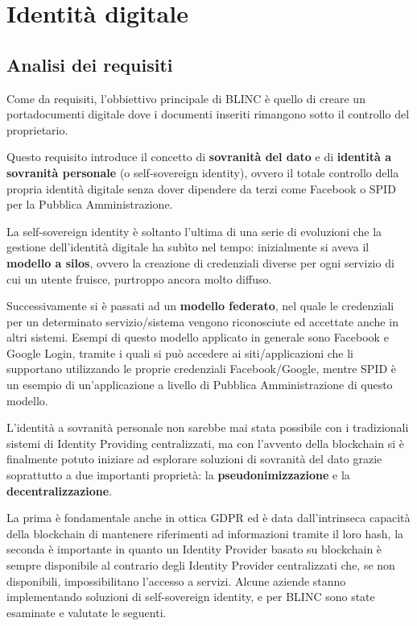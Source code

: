 \chapter{Identità digitale}

\section{Analisi dei requisiti}
Come da requisiti, l’obbiettivo principale di BLINC è quello di creare un portadocumenti digitale
dove i documenti inseriti rimangono sotto il controllo del proprietario.

Questo requisito introduce il concetto di \textbf{sovranità del dato} e di \textbf{identità a sovranità personale} (o self-sovereign identity),
ovvero il totale controllo della propria identità digitale senza dover dipendere da terzi come Facebook o SPID per la Pubblica Amministrazione.

La self-sovereign identity è soltanto l’ultima di una serie di evoluzioni che la gestione dell’identità digitale
ha subìto nel tempo: inizialmente si aveva il \textbf{modello a silos}, ovvero la creazione di credenziali diverse per ogni
servizio di cui un utente fruisce, purtroppo ancora molto diffuso.

Successivamente si è passati ad un \textbf{modello federato}, nel quale le credenziali per un determinato servizio/sistema
vengono riconosciute ed accettate anche in altri sistemi. Esempi di questo modello applicato in generale sono
Facebook e Google Login, tramite i quali si può accedere ai siti/applicazioni che li supportano utilizzando le
proprie credenziali Facebook/Google, mentre SPID è un esempio di un’applicazione a livello di Pubblica Amministrazione 
di questo modello. 

L'identità a sovranità personale non sarebbe mai stata possibile con i tradizionali sistemi di Identity Providing
centralizzati, ma con l’avvento della blockchain si è finalmente potuto iniziare ad esplorare soluzioni di sovranità
del dato grazie soprattutto a due importanti proprietà: la \textbf{pseudonimizzazione} e la \textbf{decentralizzazione}.

La prima è fondamentale anche in ottica GDPR ed è data dall’intrinseca capacità della blockchain di mantenere 
riferimenti ad informazioni tramite il loro hash, la seconda è importante in quanto un 
Identity Provider basato su blockchain è sempre disponibile al contrario degli Identity Provider centralizzati che,
se non disponibili, impossibilitano l’accesso a servizi.
Alcune aziende stanno implementando soluzioni di self-sovereign identity, e per BLINC sono state esaminate e
valutate le seguenti.

